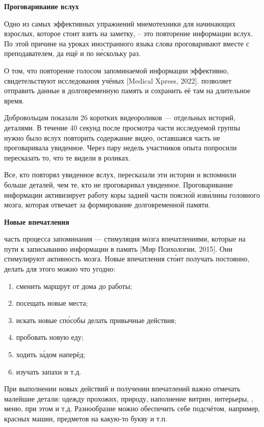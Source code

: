 \textbf{Проговаривание вслух}

Одно из самых эффективных упражнений мнемотехники для начинающих взрослых, которое стоит взять на заметку, – это повторение информации вслух. По этой причине на уроках иностранного языка слова проговаривают вместе с преподавателем, да ещё и по н\'{е}скольку раз.

О том, что повторение голосом запоминаемой информации эффективно, свидетельствуют исследования учёных [Medical Xpress, 2022].  позволяет отправить данные в долговременную память и сохранить её там на длительное время.

Добровольцам показали 26 коротких видеороликов --- отдельных историй,  деталями. В течение 40 секунд после просмотра части исследуемой группы нужно было вслух повторить содержание видео, оставшаяся часть не проговаривала увиденное. Через пару недель участников опыта попросили пересказать то, что те видели в роликах.

Все, кто повторял увиденное вслух,  пересказали эти истории и вспомнили больше деталей, чем те, кто не проговаривал увиденное. Проговаривание информации активизирует работу коры задней части поясн\'{о}й изв\'{и}лины головного мозга, которая отвечает за формирование долговременной памяти.


\textbf{Новые впечатления}

 часть процесса запоминания --– стимуляция мозга впечатлениями, которые  на пути к записыванию информации в память [Мир Психологии, 2015]. Они стимулируют активность мозга. Новые впечатления ст\'{о}ит получать постоянно, делать для этого можно что угодно:
\begin{enumerate}
    \item сменить маршрут от дома до работы;
    \item посещать новые места;
    \item искать новые сп\'{о}собы делать привычные действия;
    \item пробовать новую еду;
    \item ходить з\'{а}дом наперёд;
    \item изучать запахи и т.д.
\end{enumerate}

При выполнении новых действий и получении впечатлений важно отмечать малейшие детали: одежду прохожих, природу, наполнение витрин, интерьеры, , меню,  при этом и т.д. Разнообразие можно обеспечить себе подсчётом, например, красных машин, предметов на какую-то букву и т.п.

